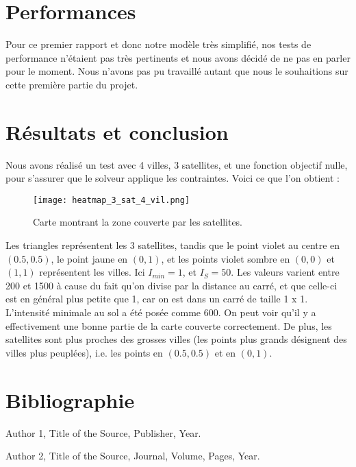 \documentclass[a4paper]{article}
\begin{document}
\section{Performances}
Pour ce premier rapport et donc notre modèle très simplifié, nos tests de performance n'étaient pas très pertinents et nous avons décidé de ne pas en parler pour le moment. Nous n'avons pas pu travaillé autant que nous le souhaitions sur cette première partie du projet. 

\section{Résultats et conclusion}
Nous avons réalisé un test avec 4 villes, 3 satellites, et une fonction objectif nulle, pour s'assurer que le solveur applique les contraintes. Voici ce que l'on obtient : 

\begin{figure}[h]
    \centering
    \texttt{[image: heatmap\_3\_sat\_4\_vil.png]}
    \caption{Carte montrant la zone couverte par les satellites.}
    \label{fig1}
\end{figure}
Les triangles représentent les 3 satellites, tandis que le point violet au centre en $(0.5,0.5)$, le point jaune en $(0,1)$, et les points violet sombre en $(0,0)$ et $(1,1)$ représentent les villes. Ici $I_{min} = 1$, et $I_S = 50$. Les valeurs varient entre 200 et 1500 à cause du fait qu'on divise par la distance au carré, et que celle-ci est en général plus petite que 1, car on est dans un carré de taille 1 x 1. 
L'intensité minimale au sol a été posée comme 600. On peut voir qu'il y a effectivement une bonne partie de la carte couverte correctement. De plus, les satellites sont plus proches des grosses villes (les points plus grands désignent des villes plus peuplées), i.e. les points en $(0.5,0.5)$ et en $(0,1)$.
 
\newpage

\section{Bibliographie}

\begin{thebibliography}{9}
Author 1, Title of the Source, Publisher, Year.

Author 2, Title of the Source, Journal, Volume, Pages, Year.


\end{thebibliography}
\end{document}
